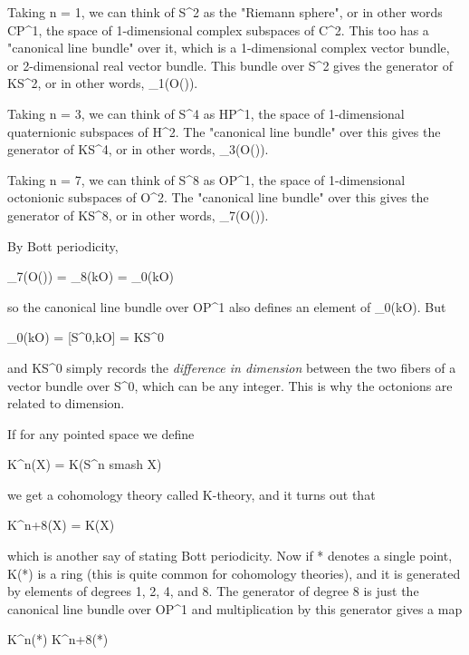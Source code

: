 Taking n = 1, we can think of S^{2} as the "Riemann sphere", or in other
words CP^{1}, the space of 1-dimensional complex subspaces of C^{2}.  This
too has a "canonical line bundle" over it, which is a 1-dimensional
complex vector bundle, or 2-dimensional real vector bundle.  This
bundle over S^{2} gives the generator of KS^{2}, or in other words,
\pi _{1}(O(\infty )).  

Taking n = 3, we can think of S^{4} as HP^{1}, the space of 1-dimensional 
quaternionic subspaces of H^{2}.  The "canonical line bundle" over this
gives the generator of KS^{4}, or in other words, \pi _{3}(O(\infty )).  

Taking n = 7, we can think of S^{8} as OP^{1}, the space of 
1-dimensional octonionic subspaces of O^{2}.  The "canonical 
line bundle" over this gives the generator of KS^{8}, or in 
other words, \pi _{7}(O(\infty )).

By Bott periodicity, 

\pi _{7}(O(\infty )) = \pi _{8}(kO) = \pi _{0}(kO)

so the canonical line bundle over OP^{1} also defines an element of
\pi _{0}(kO).  But 

\pi _{0}(kO) = [S^{0},kO] = KS^{0}

and KS^{0} simply records the \emph{difference in dimension} between
the two fibers of a vector bundle over S^{0}, which can be
any integer.  This is why the octonions are related to dimension.

If for any pointed space we define

K^{n}(X) = K(S^{n} smash X)

we get a cohomology theory called K-theory, and it turns out that 

K^{n+8}(X) = K(X)

which is another say of stating Bott periodicity.  Now if * denotes
a single point, K(*) is a ring (this is quite common for cohomology theories),
and it is generated by elements of degrees 1, 2, 4, and 8.  The
generator of degree 8 is just the canonical line bundle over OP^{1}
and multiplication by this generator gives a map

K^{n}(*) \to  K^{n+8}(*)

